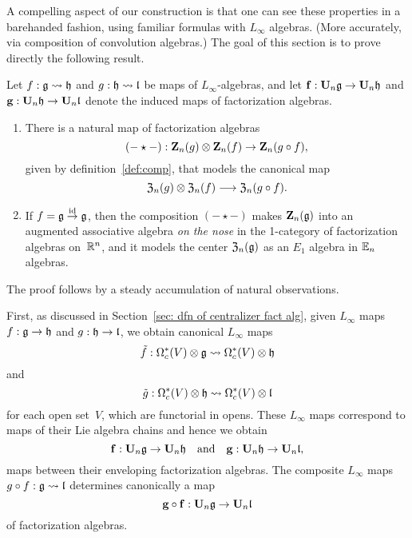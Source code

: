 \documentclass[11pt]{amsart}
\numberwithin{equation}{section}
\begin{document}
A compelling aspect of our construction is that one can see these properties in a barehanded fashion,
using familiar formulas with $L_\infty$ algebras.
(More accurately, via composition of convolution algebras.)
The goal of this section is to prove directly the following result.

\begin{thm}
\label{T:compcentralizer}
Let $f: \mathfrak g \rightsquigarrow \mathfrak h$ and $g: \mathfrak h \rightsquigarrow \mathfrak l$ be maps of  $L_\infty$-algebras,
and let $\bold{f}: \mathbf U_n \mathfrak g \to \mathbf U_n \mathfrak h$ and $\bold{g}: \mathbf U_n \mathfrak h \to \mathbf U_n \mathfrak l$ denote the induced maps of factorization algebras.
\begin{enumerate} 
\item There is a natural map of factorization algebras
\[
(-\star-) : \mathbf Z_n(g) \otimes \mathbf Z_n(f) \to \mathbf Z_n(g \circ f),
\]
given by definition~\ref{def:comp}, 
that models the canonical map 
\[
{\frak Z}_n(g) \otimes {\frak Z}_n(f) \longrightarrow {\frak Z}_n(g\circ f).
\] 
\item If $f= \mathfrak g \stackrel{{\rm id}}\to \mathfrak g$, 
then the composition $(-\star-)$ makes $\mathbf Z_n(\mathfrak g)$ into an 
augmented associative algebra {\em on the nose} in the 1-category of factorization algebras on~$\mathbb R^n$,
and it models the center ${\frak Z}_n(\mathfrak g)$ as an $E_1$ algebra in $\mathbb E_n$ algebras.
\end{enumerate}
\end{thm}

The proof follows by a steady accumulation of natural observations.

First, as discussed in Section~\ref{sec: dfn of centralizer fact alg},
given $L_\infty$ maps $f: \mathfrak g \to \mathfrak h$ and $g: \mathfrak h \to \mathfrak l$,
we obtain canonical $L_\infty$ maps
\[
\tilde{f}: \Omega^*_c(V) \otimes \mathfrak g \rightsquigarrow \Omega^*_c(V) \otimes \mathfrak h
\]
and
\[
\tilde{g}: \Omega^*_c(V) \otimes \mathfrak h \rightsquigarrow \Omega^*_c(V) \otimes \mathfrak l
\]
for each open set~$V$,
which are functorial in opens.
These $L_\infty$ maps correspond to maps of their Lie algebra chains and hence we obtain
\[ 
\mathbf{f}: \mathbf U_n \mathfrak g \to  \mathbf U_n \mathfrak h \quad \text{and} \quad \mathbf{g}: \mathbf U_n \mathfrak h \to  \mathbf U_n \mathfrak l,
\]
maps between their enveloping factorization algebras.
The composite $L_\infty$ maps $g \circ f: \mathfrak g \rightsquigarrow \mathfrak l$ determines canonically a map
\[
\mathbf{g \circ f}: \mathbf U_n \mathfrak g \to \mathbf U_n \mathfrak l
\]
of factorization algebras.
\end{document}
